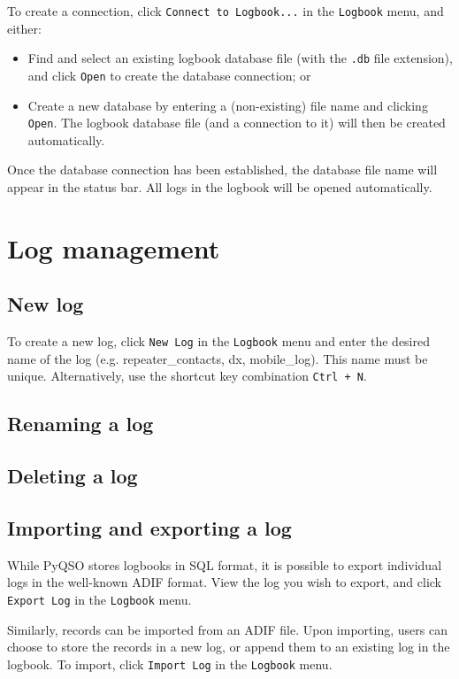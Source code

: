 \documentclass[11pt, a4paper]{report}
\begin{document}
To create a connection, click \texttt{Connect to Logbook...} in the \texttt{Logbook} menu, and either:
\begin{itemize}
  \item Find and select an existing logbook database file (with the \texttt{.db} file extension), and click \texttt{Open} to create the database connection; or
  \item Create a new database by entering a (non-existing) file name and clicking \texttt{Open}. The logbook database file (and a connection to it) will then be created automatically.
\end{itemize}
Once the database connection has been established, the database file name will appear in the status bar. All logs in the logbook will be opened automatically.

\section{Log management}
\subsection{New log}
To create a new log, click \texttt{New Log} in the \texttt{Logbook} menu and enter the desired name of the log (e.g. repeater\_contacts, dx, mobile\_log). This name must be unique. Alternatively, use the shortcut key combination \texttt{Ctrl + N}.

\subsection{Renaming a log}
\subsection{Deleting a log}

\subsection{Importing and exporting a log}
While PyQSO stores logbooks in SQL format, it is possible to export individual logs in the well-known ADIF format. View the log you wish to export, and click \texttt{Export Log} in the \texttt{Logbook} menu.

Similarly, records can be imported from an ADIF file. Upon importing, users can choose to store the records in a new log, or append them to an existing log in the logbook. To import, click \texttt{Import Log} in the \texttt{Logbook} menu.
\end{document}
